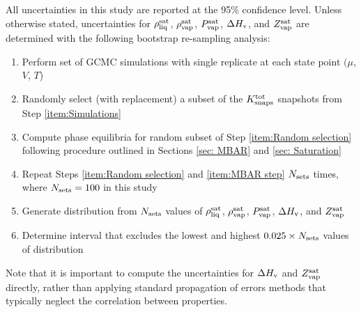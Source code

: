 \documentclass[journal=jced,manuscript=article]{achemso}
\begin{document}
All uncertainties in this study are reported at the 95\% confidence level. Unless otherwise stated, uncertainties for $\rho_{\rm liq}^{\rm sat}$, $\rho_{\rm vap}^{\rm sat}$, $P_{\rm vap}^{\rm sat}$, $\Delta H_{\rm v}$, and $Z_{\rm vap}^{\rm sat}$ are determined with the following bootstrap re-sampling analysis: \cite{Efron1979}


\begin{enumerate}
	\item Perform set of GCMC simulations with single replicate at each state point $(\mu$, $V$, $T$) \label{item:Simulations}
	\item Randomly select (with replacement) a subset of the $K^{\rm tot}_{\rm snaps}$ snapshots from Step \ref{item:Simulations} \label{item:Random selection}
	\item Compute phase equilibria for random subset of Step \ref{item:Random selection} following procedure outlined in Sections \ref{sec: MBAR} and \ref{sec: Saturation} \label{item:MBAR step}
	\item Repeat Steps \ref{item:Random selection} and \ref{item:MBAR step} $N_{\rm sets}$ times, where $N_{\rm sets} = 100$ in this study \label{item:Loop}
	\item Generate distribution from $N_{\rm sets}$ values of $\rho_{\rm liq}^{\rm sat}$, $\rho_{\rm vap}^{\rm sat}$, $P_{\rm vap}^{\rm sat}$, $\Delta H_{\rm v}$, and $Z_{\rm vap}^{\rm sat}$
	\item Determine interval that excludes the lowest and highest $0.025 \times N_{\rm sets}$ values of distribution
\end{enumerate}
Note that it is important to compute the uncertainties for $\Delta H_{\rm v}$ and $Z_{\rm vap}^{\rm sat}$ directly, rather than applying standard propagation of errors methods that typically neglect the correlation between properties\cite{Mess}.



\end{document}
